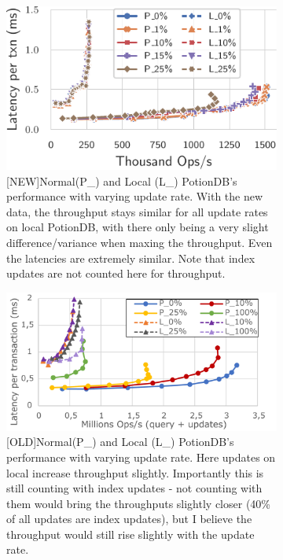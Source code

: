 \documentclass[sigplan,10pt]{acmart}
\begin{document}
\begin{figure}[h]
	\centering
	\begin{subfigure}{.47\linewidth}
		\includegraphics[width=1\linewidth]{singleQuery/upd_rate_noTC_global_vs_local}
		\caption{[NEW]Normal(P\_) and Local (L\_) PotionDB's performance with varying update rate. With the new data, the throughput stays similar for all update rates on local PotionDB, with there only being a very slight difference/variance when maxing the throughput. Even the latencies are extremely similar. Note that index updates are not counted here for throughput.}
		\label{fig:(new)update_rates_global_vs_local}
	\end{subfigure}%
	\hspace*{3em}
	\begin{subfigure}{.47\linewidth}
		\includegraphics[width=1\linewidth]{updRate_localvsglobal_cut}
		\caption{[OLD]Normal(P\_) and Local (L\_) PotionDB's performance with varying update rate. Here updates on local increase throughput slightly. Importantly this is still counting with index updates - not counting with them would bring the throughputs slightly closer (40\% of all updates are index updates), but I believe the throughput would still rise slightly with the update rate.}
		\label{fig:(old)update_rates_global_vs_local}
	\end{subfigure}
	\caption{}
\end{figure}
\end{document}
